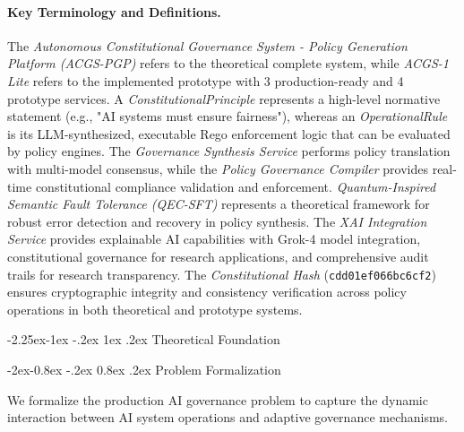 \documentclass[manuscript,screen,9pt]{acmart}
\makeatletter
\renewcommand\subsection{\@startsection{subsection}{2}{\z@}%
  {-2.25ex\@plus -1ex \@minus -.2ex}%
  {1ex \@plus .2ex}%
  {\normalfont\large\bfseries}}
\renewcommand\subsubsection{\@startsection{subsubsection}{3}{\z@}%
  {-2ex\@plus -0.8ex \@minus -.2ex}%
  {0.8ex \@plus .2ex}%
  {\normalfont\normalsize\bfseries}}
\makeatother
\begin{document}
\paragraph{Key Terminology and Definitions.} The \textit{Autonomous Constitutional Governance System - Policy Generation Platform (ACGS-PGP)} refers to the theoretical complete system, while \textit{ACGS-1 Lite} refers to the implemented prototype with 3 production-ready and 4 prototype services. A \textit{ConstitutionalPrinciple} represents a high-level normative statement (e.g., "AI systems must ensure fairness"), whereas an \textit{OperationalRule} is its LLM-synthesized, executable Rego enforcement logic that can be evaluated by policy engines. The \textit{Governance Synthesis Service} performs policy translation with multi-model consensus, while the \textit{Policy Governance Compiler} provides real-time constitutional compliance validation and enforcement. \textit{Quantum-Inspired Semantic Fault Tolerance (QEC-SFT)} represents a theoretical framework for robust error detection and recovery in policy synthesis. The \textit{XAI Integration Service} provides explainable AI capabilities with Grok-4 model integration, constitutional governance for research applications, and comprehensive audit trails for research transparency. The \textit{Constitutional Hash} (\texttt{\small{cdd01ef066bc6cf2}}) ensures cryptographic integrity and consistency verification across policy operations in both theoretical and prototype systems.

\subsection{Theoretical Foundation}
\label{subsec:theoretical_foundation}

\subsubsection{Problem Formalization}
\label{subsubsec:problem_formalization}

We formalize the production AI governance problem to capture the dynamic interaction between AI system operations and adaptive governance mechanisms.
\end{document}
